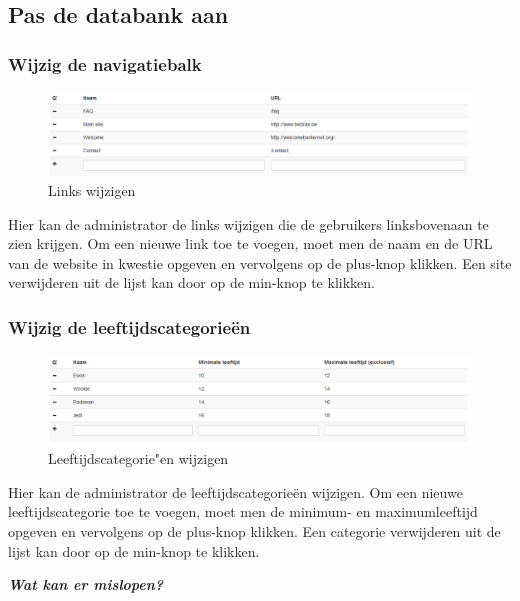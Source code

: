 \documentclass[]{article}
\begin{document}
\subsection{Pas de databank aan}

\subsubsection{Wijzig de navigatiebalk}

\begin{figure}[!ht]
	\centering
	\includegraphics[width=1\textwidth]{img/homepage_links}
	\caption{Links wijzigen}
	\label{homepage_links}
\end{figure}

Hier kan de administrator de links wijzigen die de gebruikers linksbovenaan te zien krijgen. Om een nieuwe link toe te voegen, moet men de naam en de URL van de website in kwestie opgeven en vervolgens op de plus-knop klikken. Een site verwijderen uit de lijst kan door op de min-knop te klikken.

\subsubsection{Wijzig de leeftijdscategorieën}

\begin{figure}[!ht]
	\centering
	\includegraphics[width=1\textwidth]{img/age}
	\caption{Leeftijdscategorie"en wijzigen}
	\label{age}
\end{figure}

Hier kan de administrator de leeftijdscategorieën wijzigen. Om een nieuwe leeftijdscategorie toe te voegen, moet men de minimum- en maximumleeftijd opgeven en vervolgens op de plus-knop klikken. Een categorie verwijderen uit de lijst kan door op de min-knop te klikken.

\textbf{\textit{Wat kan er mislopen?}}
\end{document}
